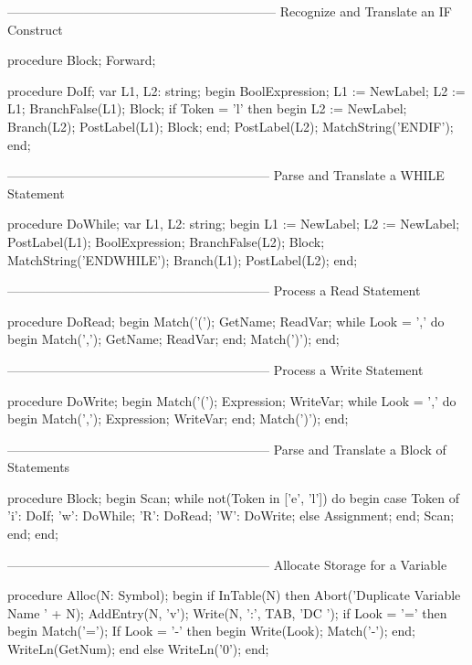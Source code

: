 \documentclass[float=false, crop=false]{standalone}
\begin{document}
\begin{code}
{---------------------------------------------------------------}
{ Recognize and Translate an IF Construct }

procedure Block; Forward;


procedure DoIf;
var L1, L2: string;
begin
   BoolExpression;
   L1 := NewLabel;
   L2 := L1;
   BranchFalse(L1);
   Block;
   if Token = 'l' then begin
      L2 := NewLabel;
      Branch(L2);
      PostLabel(L1);
      Block;
   end;
   PostLabel(L2);
   MatchString('ENDIF');
end;


{--------------------------------------------------------------}
{ Parse and Translate a WHILE Statement }

procedure DoWhile;
var L1, L2: string;
begin
   L1 := NewLabel;
   L2 := NewLabel;
   PostLabel(L1);
   BoolExpression;
   BranchFalse(L2);
   Block;
   MatchString('ENDWHILE');
   Branch(L1);
   PostLabel(L2);
end;


{--------------------------------------------------------------}
{ Process a Read Statement }

procedure DoRead;
begin
   Match('(');
   GetName;
   ReadVar;
   while Look = ',' do begin
      Match(',');
      GetName;
      ReadVar;
   end;
   Match(')');
end;


{--------------------------------------------------------------}
{ Process a Write Statement }

procedure DoWrite;
begin
   Match('(');
   Expression;
   WriteVar;
   while Look = ',' do begin
      Match(',');
      Expression;
      WriteVar;
   end;
   Match(')');
end;


{--------------------------------------------------------------}
{ Parse and Translate a Block of Statements }

procedure Block;
begin
   Scan;
   while not(Token in ['e', 'l']) do begin
      case Token of
       'i': DoIf;
       'w': DoWhile;
       'R': DoRead;
       'W': DoWrite;
      else Assignment;
      end;
      Scan;
   end;
end;


{--------------------------------------------------------------}
{ Allocate Storage for a Variable }

procedure Alloc(N: Symbol);
begin
   if InTable(N) then Abort('Duplicate Variable Name ' + N);
   AddEntry(N, 'v');
   Write(N, ':', TAB, 'DC ');
   if Look = '=' then begin
      Match('=');
      If Look = '-' then begin
         Write(Look);
         Match('-');
      end;
      WriteLn(GetNum);
      end
   else
      WriteLn('0');
end;



\end{code}
\end{document}
